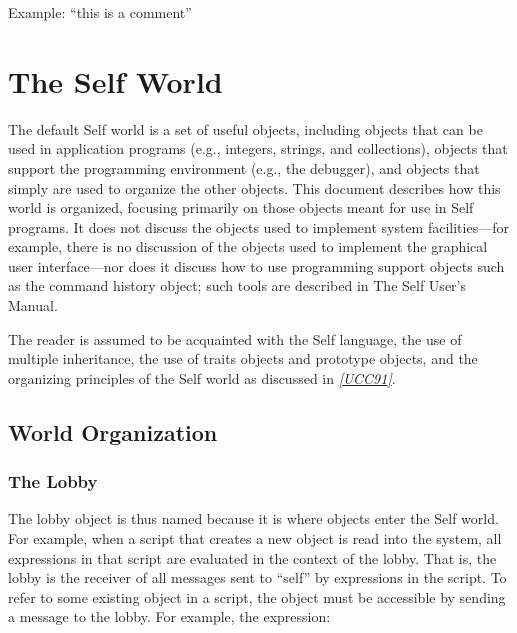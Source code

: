\documentclass[letterpaper,10pt,english]{sphinxmanual}
\begin{document}
Example: ``this is a comment''


\chapter{The Self World}
\label{selfwrld::doc}\label{selfwrld:the-self-world}
The default Self world is a set of useful objects, including objects that can be used in application
programs (e.g., integers, strings, and collections), objects that support the programming environment
(e.g., the debugger), and objects that simply are used to organize the other objects. This document
describes how this world is organized, focusing primarily on those objects meant for use in
Self programs. It does not discuss the objects used to implement system facilities—for example,
there is no discussion of the objects used to implement the graphical user interface—nor does it
discuss how to use programming support objects such as the command history object; such tools
are described in The Self User’s Manual.

The reader is assumed to be acquainted with the Self language, the use of multiple inheritance,
the use of traits objects and prototype objects, and the organizing principles of the Self world as
discussed in {\hyperref[ref:citations]{\emph{{[}UCC91{]}}}}.


\section{World Organization}
\label{worldorg::doc}\label{worldorg:world-organization}

\subsection{The Lobby}
\label{worldorg:the-lobby}
The lobby object is thus named because it is where objects enter the Self world. For example,
when a script that creates a new object is read into the system, all expressions in that script are evaluated
in the context of the lobby. That is, the lobby is the receiver of all messages sent to “self” by
expressions in the script. To refer to some existing object in a script, the object must be accessible
by sending a message to the lobby. For example, the expression:
\end{document}
